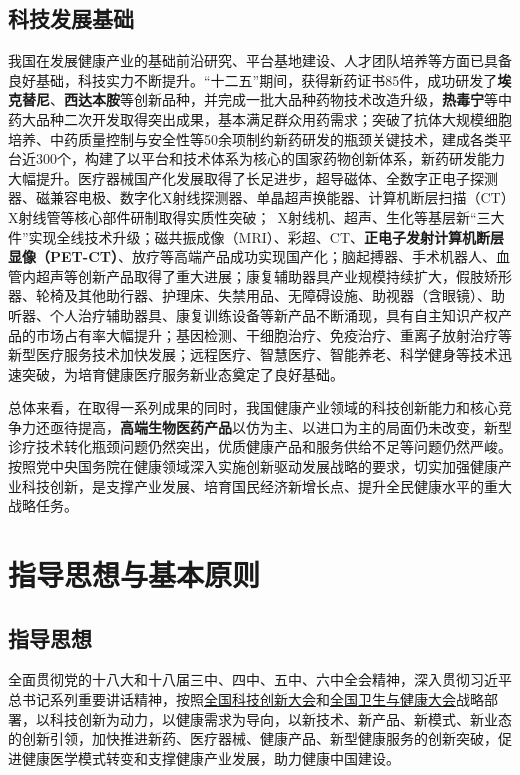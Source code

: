 \documentclass{article}
\begin{document}
\subsection{科技发展基础}

我国在发展健康产业的基础前沿研究、平台基地建设、人才团队培养等方面已具备良好基础，科技实力不断提升。“十二五”期间，获得新药证书85件，成功研发了\textbf{埃克替尼}、\textbf{西达本胺}等创新品种，并完成一批大品种药物技术改造升级，\textbf{热毒宁}等中药大品种二次开发取得突出成果，基本满足群众用药需求；突破了抗体大规模细胞培养、中药质量控制与安全性等50余项制约新药研发的瓶颈关键技术，建成各类平台近300个，构建了以平台和技术体系为核心的国家药物创新体系，新药研发能力大幅提升。医疗器械国产化发展取得了长足进步，超导磁体、全数字正电子探测器、磁兼容电极、数字化X射线探测器、单晶超声换能器、计算机断层扫描（CT）X射线管等核心部件研制取得实质性突破； X射线机、超声、生化等基层新“三大件”实现全线技术升级；磁共振成像（MRI）、彩超、CT、\textbf{正电子发射计算机断层显像（PET-CT）}、放疗等高端产品成功实现国产化；脑起搏器、手术机器人、血管内超声等创新产品取得了重大进展；康复辅助器具产业规模持续扩大，假肢矫形器、轮椅及其他助行器、护理床、失禁用品、无障碍设施、助视器（含眼镜）、助听器、个人治疗辅助器具、康复训练设备等新产品不断涌现，具有自主知识产权产品的市场占有率大幅提升；基因检测、干细胞治疗、免疫治疗、重离子放射治疗等新型医疗服务技术加快发展；远程医疗、智慧医疗、智能养老、科学健身等技术迅速突破，为培育健康医疗服务新业态奠定了良好基础。

总体来看，在取得一系列成果的同时，我国健康产业领域的科技创新能力和核心竞争力还亟待提高，\textbf{高端生物医药产品}以仿为主、以进口为主的局面仍未改变，新型诊疗技术转化瓶颈问题仍然突出，优质健康产品和服务供给不足等问题仍然严峻。按照党中央国务院在健康领域深入实施创新驱动发展战略的要求，切实加强健康产业科技创新，是支撑产业发展、培育国民经济新增长点、提升全民健康水平的重大战略任务。

\section{指导思想与基本原则}

\subsection{指导思想}

全面贯彻党的十八大和十八届三中、四中、五中、六中全会精神，深入贯彻习近平总书记系列重要讲话精神，按照\uline{全国科技创新大会}和\uline{全国卫生与健康大会}战略部署，以科技创新为动力，以健康需求为导向，以新技术、新产品、新模式、新业态的创新引领，加快推进新药、医疗器械、健康产品、新型健康服务的创新突破，促进健康医学模式转变和支撑健康产业发展，助力健康中国建设。
\end{document}
